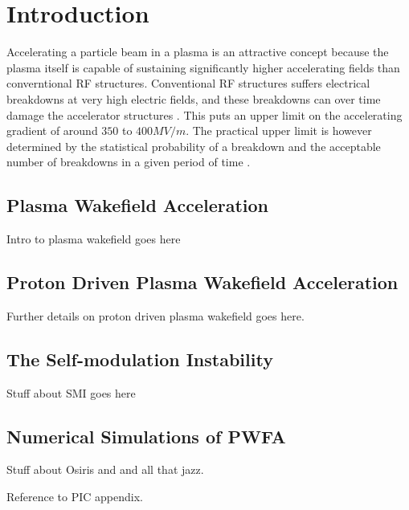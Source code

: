 %
%

\chapter{Introduction}
\label{Ch:Intro}

Accelerating a particle beam in a plasma is an attractive concept because the plasma itself is
capable of sustaining significantly higher accelerating fields than converntional RF structures.
Conventional RF structures suffers electrical breakdowns at very high electric fields, and these
breakdowns can over time damage the accelerator structures \cite{braun_frequency_2003}. This puts an
upper limit on the accelerating gradient of around $350$ to $400\unit{MV/m}$. The practical upper
limit is however determined by the statistical probability of a breakdown and the acceptable number
of breakdowns in a given period of time \cite{pritzkau_experimental_2002}.

\section{Plasma Wakefield Acceleration}
\label{Int:PWFA}

Intro to plasma wakefield goes here

\section{Proton Driven Plasma Wakefield Acceleration}
\label{Int:PDPWFA}

Further details on proton driven plasma wakefield goes here.

\section{The Self-modulation Instability}
\label{Int:SMI}

Stuff about SMI goes here

\section{Numerical Simulations of PWFA}
\label{Int:Sim}

Stuff about Osiris and and all that jazz.

Reference to PIC appendix.

